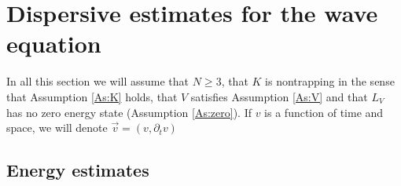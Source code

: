 \documentclass[10pt,leqno]{amsart}
\newtheorem{lemma}[theorem]{Lemma}
\theoremstyle{definition}%
\theoremstyle{remark}
\numberwithin{equation}{section}
\renewcommand{\^}{\widehat}%
\begin{document}
 
 
\section{Dispersive estimates for the wave equation}
\label{S:wave}

In all this section we will assume that $N\geq 3$, that $K$ is nontrapping in the sense that Assumption \ref{As:K} holds, that $V$ satisfies Assumption \ref{As:V} and that $L_V$ has no zero energy state (Assumption \ref{As:zero}).
If $v$ is a function of time and space, we will denote $\vec{v}=(v,\partial_tv)$

\subsection{Energy estimates}

\end{document}
